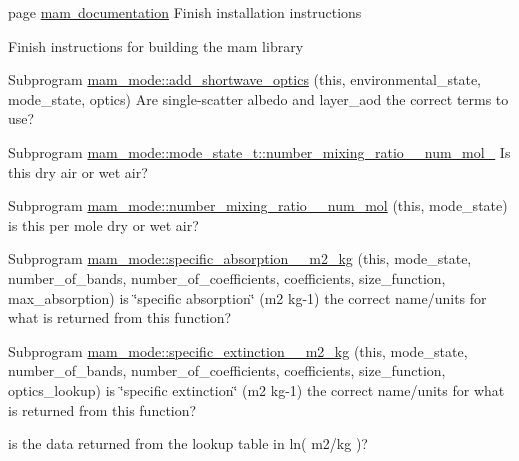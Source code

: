 
\begin{DoxyRefList}
\item[page \mbox{\hyperlink{index}{mam documentation}} ]\label{todo__todo000001}%
%
Finish installation instructions

\label{todo__todo000002}%
%
Finish instructions for building the mam library 
\item[Subprogram \mbox{\hyperlink{namespacemam__mode_ab9b38f854035795ee9ca700c989e93a4}{mam\+\_\+mode\+::add\+\_\+shortwave\+\_\+optics}} (this, environmental\+\_\+state, mode\+\_\+state, optics)]\label{todo__todo000004}%
%
Are single-\/scatter albedo and layer\+\_\+aod the correct terms to use?  
\item[Subprogram \mbox{\hyperlink{structmam__mode_1_1mode__state__t_a7ac10b68c2ff25b49d2cda9825adc915}{mam\+\_\+mode\+::mode\+\_\+state\+\_\+t\+::number\+\_\+mixing\+\_\+ratio\+\_\+\+\_\+num\+\_\+mol\+\_\+}} ]\label{todo__todo000003}%
%
Is this dry air or wet air?  
\item[Subprogram \mbox{\hyperlink{namespacemam__mode_a9b672a9f0c3a4eff42da6c9187117c2f}{mam\+\_\+mode\+::number\+\_\+mixing\+\_\+ratio\+\_\+\+\_\+num\+\_\+mol}} (this, mode\+\_\+state)]\label{todo__todo000005}%
%
is this per mole dry or wet air?  
\item[Subprogram \mbox{\hyperlink{namespacemam__mode_a7a7ccd5c378b5181b4bcbe5f2c5a2e6c}{mam\+\_\+mode\+::specific\+\_\+absorption\+\_\+\+\_\+m2\+\_\+kg}} (this, mode\+\_\+state, number\+\_\+of\+\_\+bands, number\+\_\+of\+\_\+coefficients, coefficients, size\+\_\+function, max\+\_\+absorption)]\label{todo__todo000006}%
%
is \char`\"{}specific absorption\char`\"{} (m2 kg-\/1) the correct name/units for what is returned from this function?  
\item[Subprogram \mbox{\hyperlink{namespacemam__mode_aa0ed60cc0da1e1bf74ee66e8d83106ef}{mam\+\_\+mode\+::specific\+\_\+extinction\+\_\+\+\_\+m2\+\_\+kg}} (this, mode\+\_\+state, number\+\_\+of\+\_\+bands, number\+\_\+of\+\_\+coefficients, coefficients, size\+\_\+function, optics\+\_\+lookup)]\label{todo__todo000007}%
%
is \char`\"{}specific extinction\char`\"{} (m2 kg-\/1) the correct name/units for what is returned from this function? 

\label{todo__todo000008}%
%
is the data returned from the lookup table in ln( m2/kg )? 


\end{DoxyRefList}
